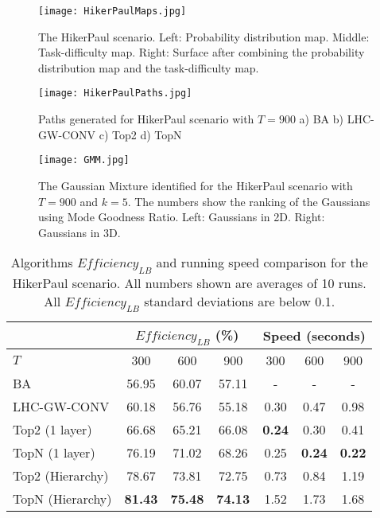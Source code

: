 \begin{figure}
\centering
\texttt{[image: HikerPaulMaps.jpg]}
\caption{The HikerPaul scenario. Left: Probability distribution map. Middle: Task-difficulty map. Right: Surface after combining the probability distribution map and the task-difficulty map.}
\label{HikerPaulMaps}
\end{figure}
\begin{figure}
\centering
\texttt{[image: HikerPaulPaths.jpg]}
\caption{Paths generated for HikerPaul scenario with $T=900$ a) BA b) LHC-GW-CONV c) Top2 d) TopN}
\label{HikerPaulPaths}
\end{figure}
\begin{figure}
\centering
\texttt{[image: GMM.jpg]}
\caption{The Gaussian Mixture identified for the HikerPaul scenario with $T=900$ and $k=5$. The numbers show the ranking of the Gaussians using Mode Goodness Ratio. Left: Gaussians in 2D. Right: Gaussians in 3D.}
\label{GMMRanking}
\end{figure}
\begin{table}
\caption{Algorithms $\mathit{Efficiency_{LB}}$ and running speed comparison for the HikerPaul scenario. All numbers shown are averages of 10 runs. All $\mathit{Efficiency_{LB}}$ standard deviations are below 0.1.}
	\centering
		\begin{tabular}
			{|l|c|c|c|c|c|c|}
			\hline
			 & \multicolumn{3}{|c|}{$\mathit{Efficiency_{LB}}$ (\%)} & \multicolumn{3}{|c|}{Speed (seconds)} \\
			\hline
			$T$ & 300 & 600 & 900	& 300 & 600 & 900 \\
			\hline
			BA & 56.95 & 60.07 & 57.11 & - & - & - \\
			\hline			
			LHC-GW-CONV & 60.18 & 56.76 & 55.18 & 0.30 & 0.47 & 0.98 \\
			\hline			
			Top2 (1 layer)	& 66.68 & 65.21 & 66.08 & \textbf{0.24} & 0.30 & 0.41 \\ 
			\hline
			TopN (1 layer)	& 76.19 & 71.02 & 68.26 & 0.25 & \textbf{0.24} & \textbf{0.22} \\ 
			\hline
			Top2 (Hierarchy) & 78.67 & 73.81 & 72.75 & 0.73 & 0.84 & 1.19 \\ 
			\hline
			TopN (Hierarchy) & \textbf{81.43} & \textbf{75.48} & \textbf{74.13} & 1.52 & 1.73 & 1.68 \\ 
			\hline			
		\end{tabular}
\label{HikerPaul}
\end{table}

